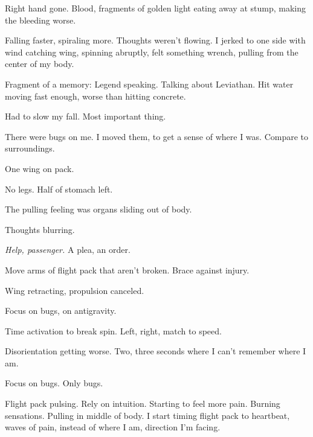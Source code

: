 Right hand gone.  Blood, fragments of golden light eating away at stump, making the bleeding worse.



Falling faster, spiraling more.  Thoughts weren't flowing.  I jerked to one side with wind catching wing, spinning abruptly, felt something wrench, pulling from the center of my body.



Fragment of a memory: Legend speaking.  Talking about Leviathan.  Hit water moving fast enough, worse than hitting concrete.



Had to slow my fall.  Most important thing.



There were bugs on me.  I moved them, to get a sense of where I was.  Compare to surroundings.



One wing on pack.



No legs.  Half of stomach left.



The pulling feeling was organs sliding out of body.



Thoughts blurring.



\emph{Help, passenger.  }A plea, an order.



Move arms of flight pack that aren't broken.  Brace against injury.



Wing retracting, propulsion canceled.



Focus on bugs, on antigravity.



Time activation to break spin.  Left, right, match to speed.



Disorientation getting worse.  Two, three seconds where I can't remember where I am.



Focus on bugs.  Only bugs.



Flight pack pulsing.  Rely on intuition.  Starting to feel more pain.  Burning sensations.  Pulling in middle of body.  I start timing flight pack to heartbeat, waves of pain, instead of where I am, direction I'm facing.



